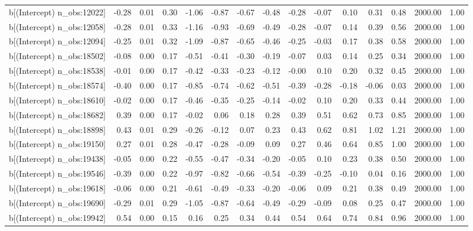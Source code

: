 \begin{table}[ht]
\begin{tabular}{rrrrrrrrrrrrrrr}
  b[(Intercept) n\_obs:12022] & -0.28 & 0.01 & 0.30 & -1.06 & -0.87 & -0.67 & -0.48 & -0.28 & -0.07 & 0.10 & 0.31 & 0.48 & 2000.00 & 1.00 \\ 
  b[(Intercept) n\_obs:12058] & -0.28 & 0.01 & 0.33 & -1.16 & -0.93 & -0.69 & -0.49 & -0.28 & -0.07 & 0.14 & 0.39 & 0.56 & 2000.00 & 1.00 \\ 
  b[(Intercept) n\_obs:12094] & -0.25 & 0.01 & 0.32 & -1.09 & -0.87 & -0.65 & -0.46 & -0.25 & -0.03 & 0.17 & 0.38 & 0.58 & 2000.00 & 1.00 \\ 
  b[(Intercept) n\_obs:18502] & -0.08 & 0.00 & 0.17 & -0.51 & -0.41 & -0.30 & -0.19 & -0.07 & 0.03 & 0.14 & 0.25 & 0.34 & 2000.00 & 1.00 \\ 
  b[(Intercept) n\_obs:18538] & -0.01 & 0.00 & 0.17 & -0.42 & -0.33 & -0.23 & -0.12 & -0.00 & 0.10 & 0.20 & 0.32 & 0.45 & 2000.00 & 1.00 \\ 
  b[(Intercept) n\_obs:18574] & -0.40 & 0.00 & 0.17 & -0.85 & -0.74 & -0.62 & -0.51 & -0.39 & -0.28 & -0.18 & -0.06 & 0.03 & 2000.00 & 1.00 \\ 
  b[(Intercept) n\_obs:18610] & -0.02 & 0.00 & 0.17 & -0.46 & -0.35 & -0.25 & -0.14 & -0.02 & 0.10 & 0.20 & 0.33 & 0.44 & 2000.00 & 1.00 \\ 
  b[(Intercept) n\_obs:18682] & 0.39 & 0.00 & 0.17 & -0.02 & 0.06 & 0.18 & 0.28 & 0.39 & 0.51 & 0.62 & 0.73 & 0.85 & 2000.00 & 1.00 \\ 
  b[(Intercept) n\_obs:18898] & 0.43 & 0.01 & 0.29 & -0.26 & -0.12 & 0.07 & 0.23 & 0.43 & 0.62 & 0.81 & 1.02 & 1.21 & 2000.00 & 1.00 \\ 
  b[(Intercept) n\_obs:19150] & 0.27 & 0.01 & 0.28 & -0.47 & -0.28 & -0.09 & 0.09 & 0.27 & 0.46 & 0.64 & 0.85 & 1.00 & 2000.00 & 1.00 \\ 
  b[(Intercept) n\_obs:19438] & -0.05 & 0.00 & 0.22 & -0.55 & -0.47 & -0.34 & -0.20 & -0.05 & 0.10 & 0.23 & 0.38 & 0.50 & 2000.00 & 1.00 \\ 
  b[(Intercept) n\_obs:19546] & -0.39 & 0.00 & 0.22 & -0.97 & -0.82 & -0.66 & -0.54 & -0.39 & -0.25 & -0.10 & 0.04 & 0.16 & 2000.00 & 1.00 \\ 
  b[(Intercept) n\_obs:19618] & -0.06 & 0.00 & 0.21 & -0.61 & -0.49 & -0.33 & -0.20 & -0.06 & 0.09 & 0.21 & 0.38 & 0.49 & 2000.00 & 1.00 \\ 
  b[(Intercept) n\_obs:19690] & -0.29 & 0.01 & 0.29 & -1.05 & -0.87 & -0.64 & -0.49 & -0.29 & -0.09 & 0.08 & 0.25 & 0.47 & 2000.00 & 1.00 \\ 
  b[(Intercept) n\_obs:19942] & 0.54 & 0.00 & 0.15 & 0.16 & 0.25 & 0.34 & 0.44 & 0.54 & 0.64 & 0.74 & 0.84 & 0.96 & 2000.00 & 1.00 \\ 

\end{tabular}
\end{table}
